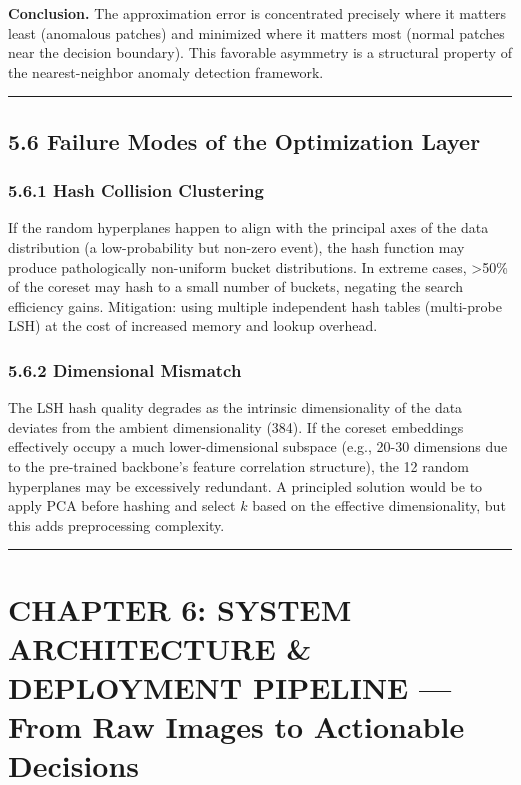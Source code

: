 \textbf{Conclusion.} The approximation error is concentrated precisely where it matters least (anomalous patches) and minimized where it matters most (normal patches near the decision boundary). This favorable asymmetry is a structural property of the nearest-neighbor anomaly detection framework.

\begin{center}\rule{0.5\linewidth}{0.5pt}\end{center}

\subsection{5.6 Failure Modes of the Optimization Layer}\label{failure-modes-of-the-optimization-layer}

\subsubsection{5.6.1 Hash Collision Clustering}\label{hash-collision-clustering}

If the random hyperplanes happen to align with the principal axes of the data distribution (a low-probability but non-zero event), the hash function may produce pathologically non-uniform bucket distributions. In extreme cases, \textgreater50\% of the coreset may hash to a small number of buckets, negating the search efficiency gains. Mitigation: using multiple independent hash tables (multi-probe LSH) at the cost of increased memory and lookup overhead.

\subsubsection{5.6.2 Dimensional Mismatch}\label{dimensional-mismatch}

The LSH hash quality degrades as the intrinsic dimensionality of the data deviates from the ambient dimensionality (384). If the coreset embeddings effectively occupy a much lower-dimensional subspace (e.g., 20-30 dimensions due to the pre-trained backbone's feature correlation structure), the 12 random hyperplanes may be excessively redundant. A principled solution would be to apply PCA before hashing and select \(k\) based on the effective dimensionality, but this adds preprocessing complexity.

\begin{center}\rule{0.5\linewidth}{0.5pt}\end{center}

\section{CHAPTER 6: SYSTEM ARCHITECTURE \& DEPLOYMENT PIPELINE --- From Raw Images to Actionable Decisions}\label{chapter-6-system-architecture-deployment-pipeline-from-raw-images-to-actionable-decisions}

